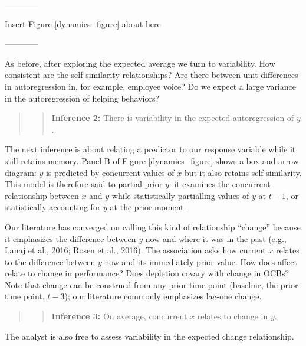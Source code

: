 \documentclass[english,,man]{apa6}
\begin{document}
\begin{center}

------------

Insert Figure \ref{dynamics_figure} about here

------------

\end{center}

As before, after exploring the expected average we turn to variability. How consistent are the self-similarity relationships? Are there between-unit differences in autoregression in, for example, employee voice? Do we expect a large variance in the autoregression of helping behaviors?

\begin{quote}
\begin{quote}
\textbf{Inference 2:} There is variability in the expected autoregression of \(y\).
\end{quote}
\end{quote}

The next inference is about relating a predictor to our response variable while it still retains memory. Panel B of Figure \ref{dynamics_figure} shows a box-and-arrow diagram: \(y\) is predicted by concurrent values of \(x\) but it also retains self-similarity. This model is therefore said to partial prior \(y\): it examines the concurrent relationship between \(x\) and \(y\) while statistically partialling values of \(y\) at \(t - 1\), or statistically accounting for \(y\) at the prior moment.

Our literature has converged on calling this kind of relationship \enquote{change} because it emphasizes the difference between \(y\) now and where it was in the past (e.g., Lanaj et al., 2016; Rosen et al., 2016). The association asks how current \(x\) relates to the difference between \(y\) now and its immediately prior value. How does affect relate to change in performance? Does depletion covary with change in OCBs? Note that change can be construed from any prior time point (baseline, the prior time point, \(t-3\)); our literature commonly emphasizes lag-one change.

\begin{quote}
\begin{quote}
\textbf{Inference 3:} On average, concurrent \(x\) relates to change in \(y\).
\end{quote}
\end{quote}

The analyst is also free to assess variability in the expected change relationship.
\end{document}

